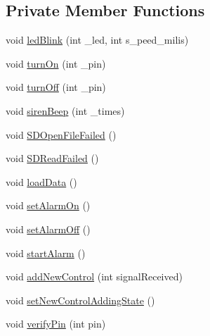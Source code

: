 \subsection*{Private Member Functions}
\begin{DoxyCompactItemize}
\item 
void \hyperlink{classAlarmCentral_afdb07ab272d4a35af8d63fbfe01bf275}{led\+Blink} (int \+\_\+led, int s\+\_\+peed\+\_\+milis)
\item 
void \hyperlink{classAlarmCentral_ad40865ee4dbd43582ab96290ba3ffedf}{turn\+On} (int \+\_\+pin)
\item 
void \hyperlink{classAlarmCentral_ae3ce5787006fdf74904f4d13d4fd9ef1}{turn\+Off} (int \+\_\+pin)
\item 
void \hyperlink{classAlarmCentral_a9ad83822d0cab018346818d506c82e01}{siren\+Beep} (int \+\_\+times)
\item 
void \hyperlink{classAlarmCentral_aa036475859e8ff772b76456cd03a6edb}{S\+D\+Open\+File\+Failed} ()
\item 
void \hyperlink{classAlarmCentral_ada8da78dc55241536625a0585903906b}{S\+D\+Read\+Failed} ()
\item 
void \hyperlink{classAlarmCentral_a8e5c2c61c973d675cd8218a6f0f9c13c}{load\+Data} ()
\item 
void \hyperlink{classAlarmCentral_a084c1a6f0fcf525f142db938beb66754}{set\+Alarm\+On} ()
\item 
void \hyperlink{classAlarmCentral_a58fb4e4ff18e9ba38c604b30b21648ba}{set\+Alarm\+Off} ()
\item 
void \hyperlink{classAlarmCentral_ac6f4bc6e3bf8a1625a988fac07da56fc}{start\+Alarm} ()
\item 
void \hyperlink{classAlarmCentral_aa66eefb693fc8b45a7ecaac806344818}{add\+New\+Control} (int signal\+Received)
\item 
void \hyperlink{classAlarmCentral_ac6c9c892c47b5afd78d5f9d4e0f8b650}{set\+New\+Control\+Adding\+State} ()
\item 
void \hyperlink{classAlarmCentral_a1f48ab01d759a081252ee956e70f0806}{verify\+Pin} (int pin)
\end{DoxyCompactItemize}

